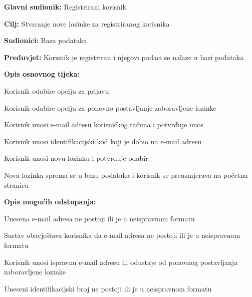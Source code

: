 \noindent {}
\begin{packed_item}

	\item \textbf{Glavni sudionik: }Registrirani korisnik
	\item  \textbf{Cilj:} Stvaranje nove lozinke za registriranog korisnika
	\item  \textbf{Sudionici:} Baza podataka
	\item  \textbf{Preduvjet:} Korisnik je registriran i njegovi podaci se nalaze u bazi podataka
	\item  \textbf{Opis osnovnog tijeka:}

	\item[] \begin{packed_enum}

		\item Korisnik odabire opciju za prijavu
		\item Korisnik odabire opciju za ponovno postavljanje zaboravljene lozinke
		\item Korisnik unosi e-mail adresu korisničkog računa i potvrđuje unos
		\item Korisnik unosi identifikacijski kod koji je dobio na e-mail adresu
		\item Korisnik unosi novu lozinku i potvrđuje odabir
		\item Nova lozinka sprema se u bazu podataka i korisnik se preusmjerava na početnu stranicu
	\end{packed_enum}

	\item  \textbf{Opis mogućih odstupanja:}

	\item[] \begin{packed_item}

		\item[3.a] Unesena e-mail adresa ne postoji ili je u neispravnom formatu
		\item[] \begin{packed_enum}

			\item Sustav obavještava korisnika da e-mail adresa ne postoji ili je u neispravnom formatu
			\item Korisnik unosi ispravnu e-mail adresu ili odustaje od ponovnog postavljanja zaboravljene lozinke

		\end{packed_enum}
		\item[4.a] Uneseni identifikacijski broj ne postoji ili je u neispravnom formatu
		\item[] \begin{packed_enum}


\end{packed_enum}
\end{packed_item}
\end{packed_item}
